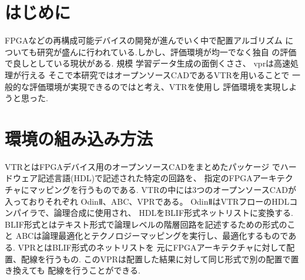 \documentclass[uplatex]{jsarticle}
\begin{document}
 
    \section{はじめに}
        FPGAなどの再構成可能デバイスの開発が進んでいく中で配置アルゴリズム
        についても研究が盛んに行われている.しかし、評価環境が均一でなく独自
        の評価で良しとしている現状がある.
        規模
        学習データ生成の面倒くささ、
        vprは高速処理が行える
        そこで本研究ではオープンソースCADであるVTRを用いることで
        一般的な評価環境が実現できるのではと考え、VTRを使用し
        評価環境を実現しようと思った.
        
        
    \section{環境の組み込み方法}
        VTRとはFPGAデバイス用のオープンソースCADをまとめたパッケージ
        でハードウェア記述言語(HDL)で記述された特定の回路を、
        指定のFPGAアーキテクチャにマッピングを行うものである.
        VTRの中には3つのオープンソースCADが入っておりそれぞれ
        OdinⅡ、ABC、VPRである。
        OdinⅡはVTRフローのHDLコンパイラで、論理合成に使用され、
        HDLをBLIF形式ネットリストに変換する.
        BLIF形式とはテキスト形式で論理レベルの階層回路を記述するための形式のこと
        ABCは論理最適化とテクノロジーマッピングを実行し、最適化するものである.
        VPRとはBLIF形式のネットリストを
        元にFPGAアーキテクチャに対して配置、配線を行うもの.
        このVPRは配置した結果に対して同じ形式で別の配置で置き換えても
        配線を行うことができる.





        
        
\end{document}
